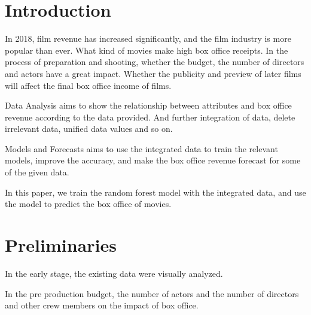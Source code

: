 \section{Introduction}
\label{sec-intro}
In 2018, film revenue has increased significantly, and the film industry is more popular than ever.
What kind of movies make high box office receipts. In the process of preparation and shooting, 
whether the budget, the number of directors and actors have a great impact. Whether the publicity and 
preview of later films will affect the final box office income of films.

Data Analysis aims to show the relationship between attributes and box office revenue 
according to the data provided. And further integration of data, delete irrelevant data, 
unified data values and so on.

Models and Forecasts aims to use the integrated data to train the relevant models, 
improve the accuracy, and make the box office revenue forecast for some of the given data.

In this paper, we train the random forest model with the integrated data, 
and use the model to predict the box office of movies.
\section{Preliminaries} \label{sec-preliminaries}
In the early stage, the existing data were visually analyzed.

In the pre production budget, the number of actors and the number of directors and other crew members on the impact of box office.


